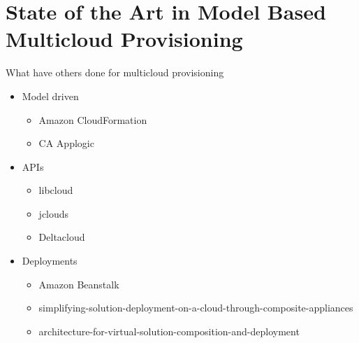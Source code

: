 \section{State of the Art in Model Based Multicloud Provisioning}

What have others done for multicloud provisioning

\begin{itemize}
  \item Model driven
    \begin{itemize}
      \item Amazon CloudFormation
      \item CA Applogic
    \end{itemize}
  \item APIs
    \begin{itemize}
      \item libcloud
      \item jclouds
      \item Deltacloud
    \end{itemize}
  \item Deployments
    \begin{itemize}
      \item Amazon Beanstalk
      \item simplifying-solution-deployment-on-a-cloud-through-composite-appliances
      \item architecture-for-virtual-solution-composition-and-deployment
    \end{itemize}
\end{itemize}
